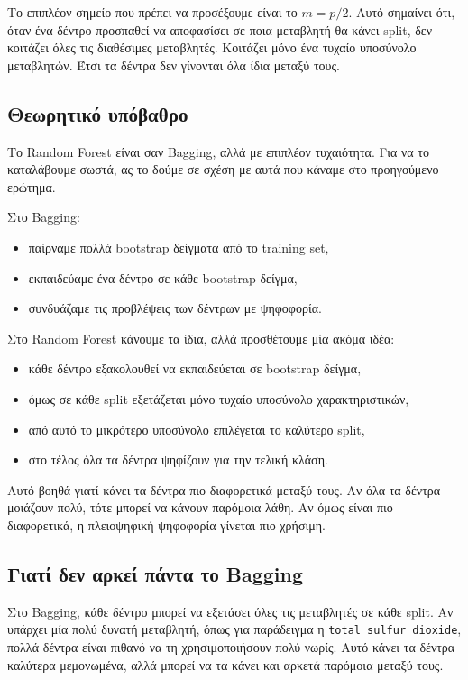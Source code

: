 \documentclass[12pt,a4paper]{article}
\newcommand{\code}[1]{\texttt{\textenglish{#1}}}
\begin{document}
Το επιπλέον σημείο που πρέπει να προσέξουμε είναι το $m=p/2$. Αυτό σημαίνει
ότι, όταν ένα δέντρο προσπαθεί να αποφασίσει σε ποια μεταβλητή θα κάνει split,
δεν κοιτάζει όλες τις διαθέσιμες μεταβλητές. Κοιτάζει μόνο ένα τυχαίο
υποσύνολο μεταβλητών. Έτσι τα δέντρα δεν γίνονται όλα ίδια μεταξύ τους.

\subsection{Θεωρητικό υπόβαθρο}

Το Random Forest είναι σαν Bagging, αλλά με επιπλέον τυχαιότητα. Για να το
καταλάβουμε σωστά, ας το δούμε σε σχέση με αυτά που κάναμε στο προηγούμενο
ερώτημα.

Στο Bagging:

\begin{itemize}
    \item παίρναμε πολλά bootstrap δείγματα από το training set,
    \item εκπαιδεύαμε ένα δέντρο σε κάθε bootstrap δείγμα,
    \item συνδυάζαμε τις προβλέψεις των δέντρων με ψηφοφορία.
\end{itemize}

Στο Random Forest κάνουμε τα ίδια, αλλά προσθέτουμε μία ακόμα ιδέα:

\begin{itemize}
    \item κάθε δέντρο εξακολουθεί να εκπαιδεύεται σε bootstrap δείγμα,
    \item όμως σε κάθε split εξετάζεται μόνο τυχαίο υποσύνολο χαρακτηριστικών,
    \item από αυτό το μικρότερο υποσύνολο επιλέγεται το καλύτερο split,
    \item στο τέλος όλα τα δέντρα ψηφίζουν για την τελική κλάση.
\end{itemize}

Αυτό βοηθά γιατί κάνει τα δέντρα πιο διαφορετικά μεταξύ τους. Αν όλα τα δέντρα
μοιάζουν πολύ, τότε μπορεί να κάνουν παρόμοια λάθη. Αν όμως είναι πιο
διαφορετικά, η πλειοψηφική ψηφοφορία γίνεται πιο χρήσιμη.

\subsection{Γιατί δεν αρκεί πάντα το Bagging}

Στο Bagging, κάθε δέντρο μπορεί να εξετάσει όλες τις μεταβλητές σε κάθε split.
Αν υπάρχει μία πολύ δυνατή μεταβλητή, όπως για παράδειγμα η
\code{total sulfur dioxide}, πολλά δέντρα είναι πιθανό να τη χρησιμοποιήσουν
πολύ νωρίς. Αυτό κάνει τα δέντρα καλύτερα μεμονωμένα, αλλά μπορεί να τα κάνει
και αρκετά παρόμοια μεταξύ τους.
\end{document}
